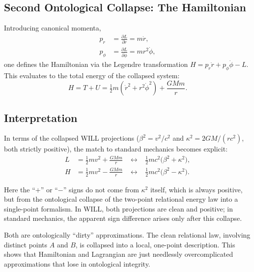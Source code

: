 \documentclass[12pt, a4paper]{article}
\begin{document}
\subsection{Second Ontological Collapse: The Hamiltonian}

Introducing canonical momenta,
\begin{align}
p_r &= \frac{\partial L}{\partial \dot r} = m\dot r, \\
p_\phi &= \frac{\partial L}{\partial \dot\phi} = mr^2\dot\phi,
\end{align}
one defines the Hamiltonian via the Legendre transformation $H = p_r \dot r + p_\phi \dot\phi - L$. This evaluates to the total energy of the collapsed system:
\begin{equation}
H = T+U = \tfrac{1}{2} m\left(\dot r^2 + r^2 \dot\phi^2\right) + \frac{GMm}{r}.
\end{equation}

\subsection{Interpretation}

In terms of the collapsed WILL projections ($\beta^2 = v^2/c^2$ and $\kappa^2 = 2GM/(rc^2)$, both strictly positive), the match to standard mechanics becomes explicit:
\begin{align}
L &= \tfrac{1}{2} m v^2 + \frac{GMm}{r}
   \;\;\;\longleftrightarrow\;\;\;
   \tfrac{1}{2} m c^2\bigl(\beta^2 + \kappa^2\bigr), \\[6pt]
H &= \tfrac{1}{2} m v^2 - \frac{GMm}{r}
   \;\;\;\longleftrightarrow\;\;\;
   \tfrac{1}{2} m c^2\bigl(\beta^2 - \kappa^2\bigr).
\end{align}

Here the ``$+$'' or ``$-$'' signs do not come from $\kappa^2$ itself, which is always positive, but from the ontological collapse of the two-point relational energy law into a single-point formalism. In WILL, both projections are clean and positive; in standard mechanics, the apparent sign difference arises only after this collapse.

Both are ontologically ``dirty''  approximations. The clean relational law, 
involving distinct points $A$ and $B$, is collapsed into a local, 
one-point description. This shows that  Hamiltonian and  Lagrangian are just needlessly overcomplicated approximations that  lose in ontological integrity.
\end{document}
